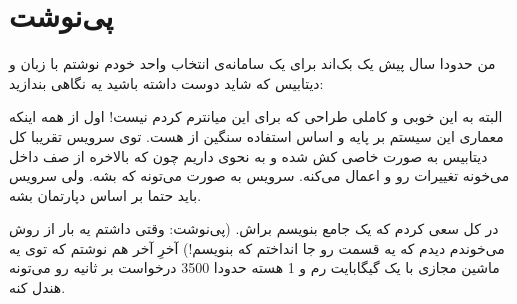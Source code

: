 \section{پی‌نوشت}
من حدودا سال پیش یک بک‌اند برای یک سامانه‌ی انتخاب واحد خودم نوشتم با زبان
 و دیتابیس 
که شاید دوست داشته باشید یه نگاهی بندازید:

\begin{latin}
\noindent
{}
\end{latin}

البته به این خوبی و کاملی طراحی که برای این میانترم کردم نیست! اول از همه اینکه معماری این سیستم
بر پایه و اساس استفاده سنگین از
هست. توی سرویس
تقریبا کل دیتابیس به صورت خاصی کش شده و
به نحوی داریم چون که
بالاخره از صف داخل
می‌خونه تغییرات رو و اعمال می‌کنه. سرویس
به صورت
می‌تونه که
بشه. ولی سرویس
باید حتما بر اساس دپارتمان
بشه.

در کل سعی کردم که یک
جامع بنویسم براش. (پی‌نوشت: وقتی داشتم یه بار از روش می‌خوندم دیدم که یه قسمت رو جا انداختم که بنویسم!)
آخرِ آخر
هم نوشتم که توی یه ماشین مجازی با یک گیگابایت رم و 1 هسته
حدودا 3500 درخواست بر ثانیه رو می‌تونه هندل کنه.